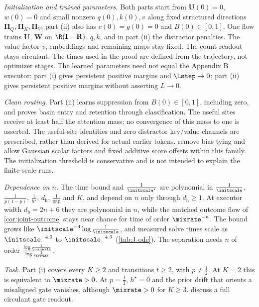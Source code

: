 \begin{remark}
\label{rem:joint-scope}
\emph{Initialization and trained parameters.} Both parts start from $\mathbf U(0)=0$, $w(0)=0$ and small nonzero
$q(0),k(0),v$ along fixed structured directions $\bm\Pi_Q,\bm\Pi_K,\bm\Pi_V$; part (ii) also has $c(0)=g(0)=0$ and
$B(0)\in[0,1]$. One flow trains $\mathbf U$, $\mathbf W$ on $\R(\mathbf I-\mathbf R)$, $q,k$, and in part (ii) the distractor
penalties. The value factor $v$, embeddings and remaining maps stay fixed. The count readout stays circulant.
The times used in the proof are defined from the trajectory, not optimizer stages. The learned parameters need not equal the Appendix B executor:
part (i) gives persistent positive margins and $\Lstep\to0$; part (ii) gives persistent positive margins without asserting $L\to0$.

\emph{Clean routing.} Part (ii) learns suppression from $B(0)\in[0,1]$, including zero, and proves basin entry and retention
through classification. The useful sites receive at least half the attention mass; no convergence of this mass to one is asserted.
The useful-site identities and zero distractor key/value channels are prescribed, rather than derived for actual earlier tokens.
 remove bias tying and allow Gaussian scalar factors and fixed additive score
offsets within this family. The initialization threshold is conservative and is not intended to explain the finite-scale runs.

\emph{Dependence on $n$.} The time bound and $\frac{1}{\initscale^\star}$ are polynomial in $\frac{1}{\initscale}$,
$\frac{1}{p(1-p)}$, $\frac{1}{h^\star}$, $d_{\mathrm h}$, $\frac{1}{\mathrm{gap}}$ and $K$, and depend on $n$ only through
$d_{\mathrm h}\ge1$. At executor width $d_{\mathrm h}=2n+6$ they are polynomial in $n$, while the matched outcome flow
of \cref{cor:joint-outcome} stays near chance for time of order $\mixrate^{-n}$. The bound grows like
$\initscale^{-4}\log\frac{1}{\initscale}$, and measured solve times scale as $\initscale^{-4.0}$ to $\initscale^{-4.3}$
(\cref{tab:J-ode}). The separation needs $n$ of order $\frac{\log\frac{1}{\initscale}}{\log\frac{1}{\mixrate}}$.

\emph{Task.} Part (i) covers every $K\ge2$ and transitions $t\ge2$, with $p\ne\frac12$. At $K=2$ this is equivalent to
$\mixrate>0$. At $p=\frac12$, $h^\star=0$ and the prior drift that orients a misaligned gate vanishes, although
$\mixrate>0$ for $K\ge3$.  discuss a full circulant gate readout.
\end{remark}


